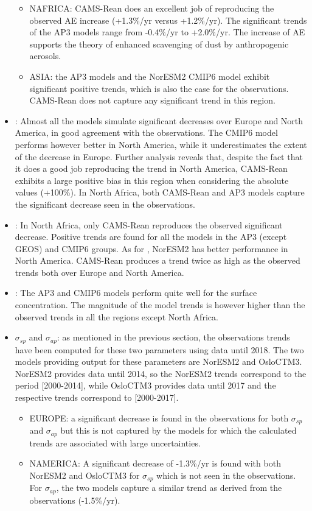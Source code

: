 \documentclass[acp, manuscript]{copernicus}
\begin{document}
\begin{itemize}
\begin{itemize}
        \item NAFRICA: CAMS-Rean does an excellent job of reproducing the observed AE increase (+1.3\%/yr versus +1.2\%/yr). The significant trends of the AP3 models range from -0.4\%/yr to +2.0\%/yr. The increase of AE supports the theory of enhanced scavenging of dust by anthropogenic aerosols.
        \item ASIA: the AP3 models and the NorESM2 CMIP6 model exhibit significant positive trends, which is also the case for the observations. CAMS-Rean does not capture any significant trend in this region.
       \end{itemize}
 \item {}: Almost all the models simulate significant decreases over Europe and North America, in good agreement with the observations. The CMIP6 model performs however better in North America, while it underestimates the extent of the decrease in Europe. Further analysis reveals that, despite the fact that it does a good job reproducing the  trend in North America, CAMS-Rean exhibits a large positive bias in this region when considering the absolute values (+100\%). In North Africa, both CAMS-Rean and AP3 models capture the significant decrease seen in the observations.
 \item {}: In North Africa, only CAMS-Rean reproduces the observed significant decrease. Positive trends are found for all the models in the AP3 (except GEOS) and CMIP6 groups. As for , NorESM2 has better performance in North America. CAMS-Rean produces a trend twice as high as the observed trends both over Europe and North America.
 \item {}: The AP3 and CMIP6 models perform quite well for the  surface concentration. The magnitude of the model trends is however higher than the observed trends in all the regions except North Africa.
 \item $\sigma_{sp}$ and $\sigma_{ap}$:  as mentioned in the previous section, the observations trends have been computed for these two parameters using data until 2018. The two models providing output for these parameters are NorESM2 and OsloCTM3. NorESM2 provides data until 2014, so the NorESM2 trends correspond to the period [2000-2014], while OsloCTM3 provides data until 2017 and the respective trends correspond to [2000-2017].
       \begin{itemize}
        \item EUROPE: a significant decrease is found in the observations for both $\sigma_{sp}$ and $\sigma_{ap}$ but this is not captured by the models for which the calculated trends are associated with large uncertainties.
        \item NAMERICA: A significant decrease of -1.3\%/yr is found with both NorESM2 and OsloCTM3 for $\sigma_{sp}$ which is not seen in the observations. For $\sigma_{ap}$, the two models capture a similar trend as derived from the observations (-1.5\%/yr).
       \end{itemize}
\end{itemize}
\end{document}
